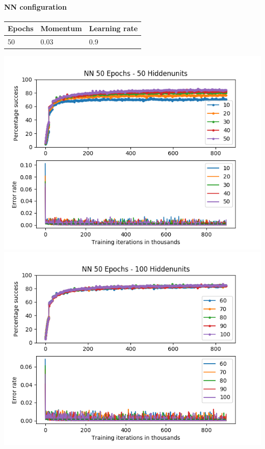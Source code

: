 \documentclass[11pt]{article}
\makeatletter
\def\maxwidth{\ifdim\Gin@nat@width>\linewidth\linewidth
    \else\Gin@nat@width\fi}
\let\Oldincludegraphics\includegraphics
\renewcommand{\includegraphics}[1]{\Oldincludegraphics[width=.8\maxwidth]{#1}}
\makeatother
\begin{document}
\hypertarget{nn-configuration}{%
\paragraph{NN configuration}\label{nn-configuration}}

\begin{longtable}[]{@{}lll@{}}
\toprule
Epochs & Momentum & Learning rate\tabularnewline
\midrule
\endhead
50 & 0.03 & 0.9\tabularnewline
\bottomrule
\end{longtable}

\includegraphics{50Epochs_Momentum_03_Experiment3/NN_50Epochs_50Hiddenunits.png}
\includegraphics{50Epochs_Momentum_03_Experiment3/NN_50Epochs_100Hiddenunits.png}
\end{document}
